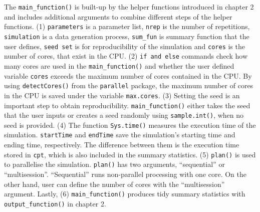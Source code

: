 \documentclass[11pt,a4paper]{article}
\begin{document}
The \texttt{main\_function()} is built-up by the helper functions
introduced in chapter 2 and includes additional arguments to combine
different steps of the helper functions. (1) \texttt{parameters} is a
parameter list, \texttt{nrep} is the number of repetitions,
\texttt{simulation} is a data generation process, \texttt{sum\_fun} is
summary function that the user defines, \texttt{seed\ set} is for
reproducibility of the simulation and \texttt{cores} is the number of
cores, that exist in the CPU. (2) \texttt{if\ and\ else} commands check
how many cores are used in the \texttt{main\_function()} and whether the
user defined variable \texttt{cores} exceeds the maximum number of cores
contained in the CPU. By using \texttt{detectCores()} from the
\texttt{parallel} package, the maximum number of cores in the CPU is
saved under the variable \texttt{max.cores}. (3) Setting the seed is an
important step to obtain reproducibility. \texttt{main\_function()}
either takes the seed that the user inputs or creates a seed randomly
using \texttt{sample.int()}, when no seed is provided. (4) The function
\texttt{Sys.time()} measures the execution time of the simulation.
\texttt{startTime} and \texttt{endTime} save the simulation's starting
time and ending time, respectively. The difference between them is the
execution time stored in \texttt{cpt}, which is also included in the
summary statistics. (5) \texttt{plan()} is used to parallelise the
simulation. \texttt{plan()} has two arguments, ``sequential'' or
``multisession''. ``Sequential'' runs non-parallel processing with one
core. On the other hand, user can define the number of cores with the
``multisession'' argument. Lastly, (6) \texttt{main\_function()}
produces tidy summary statistics with \texttt{output\_function()} in
chapter 2.
\end{document}
